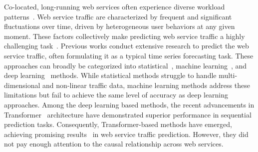 Co-located, long-running web services often experience diverse workload patterns~\cite{zou2024optscaler}. Web service traffic are characterized by frequent and significant fluctuations over time, driven by heterogeneous user behaviors at any given moment. These factors collectively make predicting web service traffic a highly challenging task~\cite{straesser2025trust, pan2023magicscaler}.
Previous works conduct extensive research to predict the web service traffic, often formulating it as a typical time series forecasting task. These approaches can broadly be categorized into statistical~\cite{kapgate2014weighted, hu2016autoscaling, kumar2016forecasting}, machine learning~\cite{issa2017using, daraghmeh2018linear, hu2019stream}, and deep learning~\cite{ruan2023workload, guo2018applying, pan2023magicscaler, zou2024optscaler} methods.
While statistical methods struggle to handle multi-dimensional and non-linear traffic data, machine learning methods address these limitations but fail to achieve the same level of accuracy as deep learning approaches. 
Among the deep learning based methods, the recent advancements in Transformer~\cite{vaswani2017attention} architecture have demonstrated superior performance in sequential prediction tasks. Consequently, Transformer-based methods have emerged, achieving promising results~\cite{qi2022performer} in web service traffic prediction.
However, they did not pay enough attention to the causal relationship across web services.

